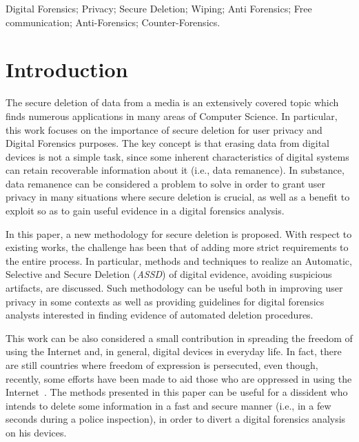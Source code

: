 \documentclass[conference]{IEEEtran}
\newcommand{\assd}{\emph{ASSD}\xspace}
\begin{document}
\begin{keywords}
Digital Forensics; Privacy; Secure Deletion; Wiping; Anti Forensics; Free communication; Anti-Forensics; Counter-Forensics.
\end{keywords}

\IEEEpeerreviewmaketitle


\section{Introduction}
\label{intro}
The secure deletion of data from a media is an extensively covered topic which finds numerous applications in many areas of Computer Science. In particular, this work focuses on the importance of secure deletion for user privacy and Digital Forensics purposes. The key concept is that erasing data from digital devices is not a simple task, since some inherent characteristics of digital systems can retain recoverable information about it (i.e., data remanence).
In substance, data remanence can be considered a problem to solve in order to grant user privacy in many situations where secure deletion is crucial, as well as a benefit to exploit so as to gain useful evidence in a digital forensics analysis.

In this paper, a new methodology for secure deletion is proposed. With respect to existing works, the challenge has been that of adding more strict requirements to the entire process. In particular, methods and techniques to realize an Automatic, Selective and Secure Deletion (\assd) of digital evidence, avoiding suspicious artifacts, are discussed. Such methodology can be useful both in improving user privacy in some contexts as well as providing guidelines for digital forensics analysts interested in finding evidence of automated deletion procedures.

This work can be also considered a small contribution in spreading the freedom of using the Internet and, in general, digital devices in everyday life. In fact, there are still countries where freedom of expression is persecuted, even though, recently, some efforts have been made to aid those who are oppressed in using the Internet~\cite{obama}. The methods presented in this paper can be useful for a dissident who intends to delete some information in a fast and secure manner (i.e., in a few seconds during a police inspection), in order to divert a digital forensics analysis on his devices.
\end{document}
